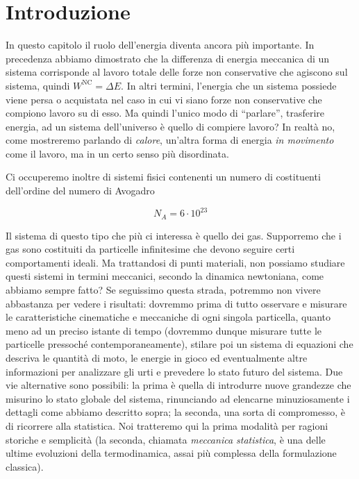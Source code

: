 \marginpar{\minitoc}

\section{Introduzione}
In questo capitolo il ruolo dell'energia diventa ancora più
importante. In precedenza abbiamo dimostrato che la differenza di
energia meccanica di un sistema corrisponde al lavoro totale delle
forze non conservative che agiscono sul sistema, quindi $W^\text{NC} = \Delta E$.
In altri termini, l'energia che un sistema possiede viene persa o
acquistata nel caso in cui vi siano forze non conservative che
compiono lavoro su di esso. Ma quindi l'unico modo di ``parlare'',
trasferire energia, ad un sistema dell'universo è quello di compiere
lavoro? In realtà no, come mostreremo parlando di \textit{calore},
un'altra forma di energia \textit{in movimento} come il lavoro, ma
in un certo senso più disordinata.

Ci occuperemo inoltre di sistemi fisici contenenti un numero di
costituenti dell'ordine del numero di Avogadro

\[ N_A = 6 \cdot 10^{23} \]

\noindent Il sistema di questo tipo che più ci interessa è quello
dei gas. Supporremo che i gas sono costituiti da particelle
infinitesime che devono seguire certi comportamenti ideali. Ma
trattandosi di punti materiali, non possiamo studiare questi
sistemi in termini meccanici, secondo la dinamica newtoniana,
come abbiamo sempre fatto? Se seguissimo questa strada, potremmo
non vivere abbastanza per vedere i risultati: dovremmo prima di
tutto osservare e misurare le caratteristiche cinematiche e
meccaniche di ogni singola particella, quanto meno ad un preciso istante di
tempo (dovremmo dunque misurare tutte le particelle pressoché
contemporaneamente), stilare poi un sistema di equazioni che
descriva le quantità di moto, le energie in gioco ed eventualmente
altre informazioni per analizzare gli urti e prevedere lo stato
futuro del sistema. Due vie alternative sono possibili: la prima è
quella di introdurre nuove grandezze che misurino lo stato globale
del sistema, rinunciando ad elencarne minuziosamente i dettagli come
abbiamo descritto sopra; la seconda, una sorta di compromesso,
è di ricorrere alla statistica. Noi tratteremo qui la prima modalità
per ragioni storiche e semplicità (la seconda, chiamata \textit{meccanica statistica},
è una delle ultime evoluzioni della termodinamica, assai più
complessa della formulazione classica).

